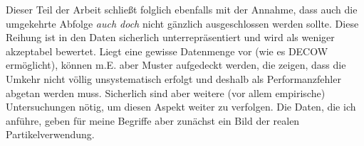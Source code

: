 \noindent
Dieser Teil der Arbeit schließt folglich ebenfalls mit der Annahme, dass auch die umgekehrte Abfolge \textit{auch doch} nicht gänzlich ausgeschlossen werden sollte. Diese Reihung ist in den Daten sicherlich unterrepräsentiert und wird als weniger akzeptabel bewertet. Liegt eine gewisse Datenmenge vor (wie es DECOW ermöglicht), können m.E. aber Muster aufgedeckt werden, die zeigen, dass die Umkehr nicht völlig unsystematisch erfolgt und deshalb als Performanzfehler abgetan werden muss. Sicherlich sind aber weitere (vor allem empirische) Untersuchungen nötig, um diesen Aspekt weiter zu verfolgen. Die Daten, die ich anführe, geben für meine Begriffe aber zunächst ein Bild der realen Partikelverwendung.
